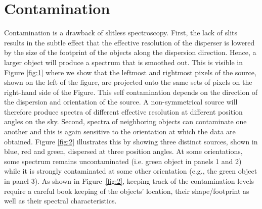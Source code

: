 \documentclass[preprint]{aastex}
\begin{document}
\section{Contamination}
Contamination is a drawback of slitless spectroscopy. First, the lack of slits results in the subtle effect that the effective resolution of the disperser is lowered by the size of the footprint of the objects along the dispersion direction. Hence, a larger object will produce a spectrum that is smoothed out. This is visible in Figure \ref{fig:1} where we show that the leftmost and rightmost pixels of the source, shown on the left of the figure, are projected onto the same sets of pixels on the right-hand side of the Figure. This self contamination depends on the direction of the dispersion and orientation of the source. A non-symmetrical source will therefore produce spectra of different effective resolution at different position angles on the sky. Second, spectra of neighboring objects can contaminate one another and this is again sensitive to the orientation at which the data are obtained. Figure \ref{fig:2} illustrates this by showing three distinct sources, shown in blue, red and green, dispersed at three position angles. At some orientations, some spectrum remains uncontaminated (i.e. green object in panels 1 and 2) while it is strongly contaminated at some other orientation (e.g., the green object in panel 3). As shown in Figure~\ref{fig:2}, keeping track of the contamination levels require a careful book keeping of the objects' location, their shape/footprint as well as their spectral characteristics.
\end{document}

